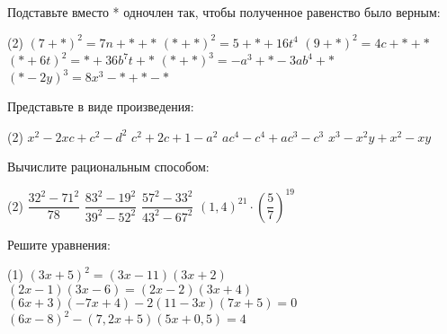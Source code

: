 \begin{exam}
	\begin{listofex}
		\item Подставьте вместо * одночлен так, чтобы полученное равенство было верным:
		\begin{tasks}(2)
			\task \( (7+*)^2=7n+*+* \)
			\task \( (*+*)^2=5+*+16t^4 \)
			\task \( (9+*)^2=4c+*+* \)
			\task \( (*+6t)^2=*+36b^7t+* \)
			\task \( (*+*)^3= -a^3+*-3ab^4+* \)
			\task \( (*-2y)^3=8x^3-*+*-* \)
		\end{tasks}
		
		\item Представьте в виде произведения:
		\begin{tasks}(2)
			\task \( x^2-2xc+c^2-d^2 \)
			\task \( c^2+2c+1-a^2 \)
			\task \( ac^4-c^4+ac^3-c^3 \)
			\task \( x^3-x^2y+x^2-xy \)
		\end{tasks}
		
		
		
		
		
		\item Вычислите рациональным способом:
		\begin{tasks}(2)
			\task \( \dfrac{32^2-71^2}{78}  \)
			\task \( \dfrac{83^2-19^2}{39^2-52^2} \)
			\task \( \dfrac{57^2-33^2}{43^2-67^2} \)
			\task \( (1,4)^{21} \cdot \left( \dfrac{5}{7} \right)^{19} \)
		\end{tasks}
		\item Решите уравнения:
		\begin{tasks}(1)
			\task \( (3x+5)^2= (3x-11)(3x+2) \)
			\task \( (2x-1)(3x-6)=(2x-2)(3x+4) \)
			\task \( (6x+3)(-7x+4) - 2(11-3x)(7x+5)=0 \)
			\task \( (6x-8)^2 - (7,2x+5)(5x+0,5)=4 \)
		\end{tasks}
	\end{listofex}
\end{exam}
